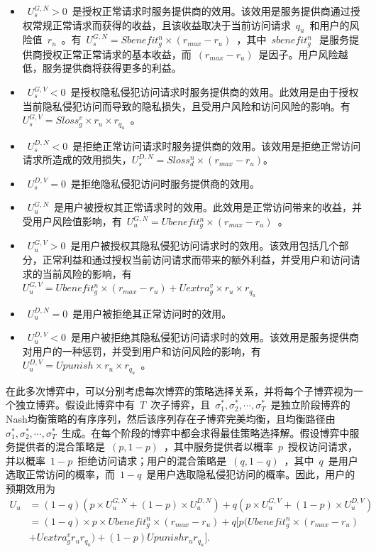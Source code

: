 \begin{itemize}
	\item ~$U_s^{G,N} >0$~是授权正常请求时服务提供商的效用。该效用是服务提供商通过授权常规正常请求而获得的收益，且该收益取决于当前访问请求~$q_u$~和用户的风险值~$r_u$~。有~$U_s^{G,N}= Sbenefit_g^n\times (r_{max}-r_u)$~​​，其中~$sbenefit_g^n~$~是服务提供商授权正常正常请求的基本收益，而~$(r_{max}-r_u)$~​​是因子。用户风险越低，服务提供商将获得更多的利益。
	\item ~$U_s^{G,V}<0$~是授权隐私侵犯访问请求时服务提供商的效用。此效用是由于授权当前隐私侵犯访问而导致的隐私损失，且受用户风险和访问风险的影响。有~$U_s^{G,V}= Sloss_g^v \times r_u \times r_{q_u}$~。
	\item ~$U_s^{D,N} < 0$~是拒绝正常访问请求时服务提供商的效用。该效用是拒绝正常访问请求所造成的效用损失，$U_s^{D,N}= Sloss_d^n \times (r_{max}-r_u)$。
	\item ~$U_s^{D,V} = 0$~是拒绝隐私侵犯访问时服务提供商的效用。
	\item ~$U_u^{G,N}$~是用户被授权其正常请求时的效用。此效用是正常访问带来的收益，并受用户风险值影响，有~$U_u^{G,N}= Ubenefit_g^n \times(r_{max} - r_u)$~。
	\item ~$U_u^{G,V} >0$~是用户被授权其隐私侵犯访问请求时的效用。该效用包括几个部分，正常利益和通过授权当前访问请求而带来的额外利益，并受用户和访问请求的当前风险的影响，有~$U_u^{G,V}= Ubenefit_g^n\times(r_{max} - r_u) + Uextra_g^v \times r_u\times r_{q_u}$~
	\item ~$U_u^{D,N} =0$~是用户被拒绝其正常访问时的效用。
	\item ~$U_u^{D,V}<0$~是用户被拒绝其隐私侵犯访问请求时的效用。该效用是服务提供商对用户的一种惩罚，并受到用户和访问风险的影响，有~$U_u^{D,V}= Upunish \times r_u \times r_{q_u}$~。
\end{itemize}

在此多次博弈中，可以分别考虑每次博弈的策略选择关系，并将每个子博弈视为一个独立博弈。假设此博弈中有~$T$~次子博弈，且~$\sigma_1^*, \sigma_2^*, \cdots, \sigma_T^*$~是独立阶段博弈的Nash均衡策略的有序序列，然后该序列存在子博弈完美均衡，且均衡路径由~$\sigma_1^*, \sigma_2^*, \cdots, \sigma_T^*$~生成。在每个阶段的博弈中都会求得最佳策略选择解。假设博弈中服务提供者的混合策略是~$(p,1-p)$~，其中服务提供者以概率~$p$~授权访问请求，并以概率~$1-p$~拒绝访问请求；用户的混合策略是~$(q,1-q)$~，其中{~$q$~}是用户选取正常访问的概率，而~$1-q$~是用户选取隐私侵犯访问的概率。因此，用户的预期效用为
\begin{equation}
\begin{split}
U_u&= (1-q)(p\times U_u^{G,N}+ (1-p)\times U_u^{D,N})+ q(p\times U_u^{G,V}+(1-p)\times U_u^{D,V})\\
&=(1-q)\times p \times Ubenefit_g^n \times(r_{max} - r_u)+ q[p(Ubenefit_g^n\times(r_{max} - r_u) \\
&+ Uextra_g^v r_ur_{q_u})+(1-p)Upunishr_ur_{q_u}].
\end{split}
\end{equation}

